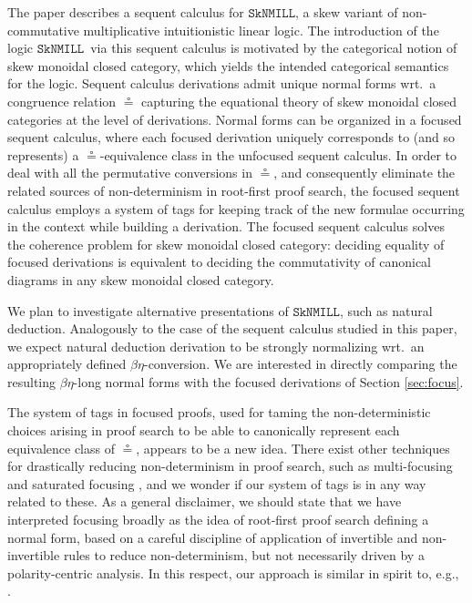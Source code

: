 \documentclass[copyright,creativecommons]{eptcs}
\theoremstyle{definition}
\newcommand{\SkNMILL}{$\mathtt{SkNMILL}$}
\begin{document}
The paper describes a sequent calculus for \SkNMILL, a skew variant of non-commutative multiplicative intuitionistic linear logic. The introduction of the logic \SkNMILL\ via this sequent calculus is motivated by the categorical notion of skew monoidal closed category, which yields the intended categorical semantics for the logic. Sequent calculus derivations admit unique normal forms wrt.\ a congruence relation $\circeq$ capturing the equational theory of skew monoidal closed categories at the level of derivations. Normal forms can be organized in a focused sequent calculus, where each focused derivation uniquely corresponds to (and so represents) a $\circeq$-equivalence class in the unfocused sequent calculus. In order to deal with all the permutative conversions in $\circeq$, and consequently eliminate the related sources of non-determinism in root-first proof search, the focused sequent calculus employs a system of tags for keeping track of the new formulae occurring in the context while building a derivation. The focused sequent calculus solves the coherence problem for skew monoidal closed category: deciding equality of focused derivations is equivalent to deciding the commutativity of canonical diagrams in any skew monoidal closed category.

We plan to investigate alternative presentations of \SkNMILL, such as natural deduction. Analogously to the case of the sequent calculus studied in this paper, we expect natural deduction derivation to be strongly normalizing wrt.\ an appropriately defined $\beta\eta$-conversion. We are interested in directly comparing the resulting $\beta\eta$-long normal forms with the focused derivations of Section \ref{sec:focus}.

The system of tags in focused proofs, used for taming the non-deterministic choices arising in proof search to be able to canonically represent each equivalence class of $\circeq$, appears to be a new idea. %
There exist other techniques for drastically reducing non-determinism in proof search, such as multi-focusing \cite{chaudhuri:canonical:2008} and saturated focusing \cite{scherer:simple:2015}, and we wonder if our system of tags is in any way related to these. As a general disclaimer, we should state that we have interpreted focusing broadly as the idea of root-first proof search defining a normal form, based on a careful discipline of application of invertible and non-invertible rules to reduce non-determinism, but not necessarily driven by a polarity-centric analysis. In this respect, our approach is similar in spirit to, e.g., \cite{dyckhoff:ljq}.
\end{document}
